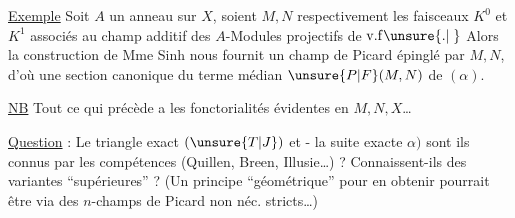 
\uline{Exemple} Soit $A$ un anneau sur $X$, soient $M,N$ respectivement les faisceaux $K^{0}$ et $K^{1}$ associés au champ additif des $A$-Modules projectifs de $\mathrm{v}.\mathrm{f}\unsure{.|\phantom{.}}$  Alors la construction de Mme Sinh nous fournit un champ de Picard épinglé par $M,N$, d'où une section  canonique du terme médian $\unsure{P|F}(M,N)$ de $(\alpha)$.

\uline{NB} Tout ce qui précède a les fonctorialités évidentes en $M,N,X$\ldots

\uline{Question} : Le triangle exact $(\unsure{T|J})$ et - la suite exacte $\alpha)$ sont ils connus par les compétences (Quillen, Breen, Illusie\ldots) ? Connaissent-ils des variantes ``supérieures'' ? (Un principe ``géométrique'' pour en obtenir pourrait être via des $n$-champs de Picard non néc. stricts\ldots)
